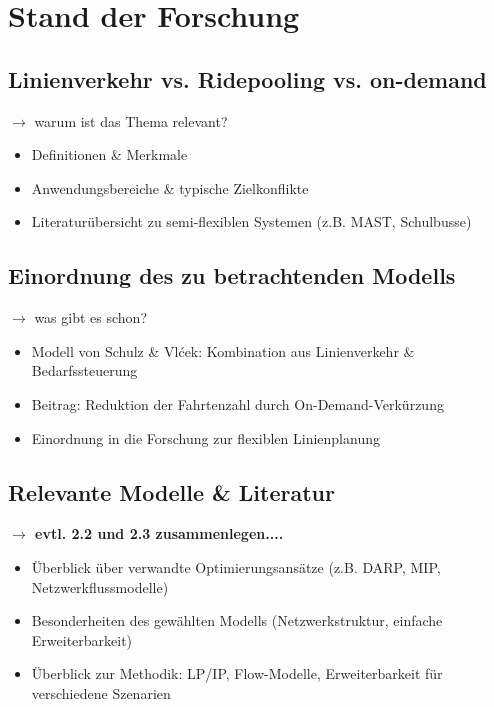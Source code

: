 \chapter{Stand der Forschung}
\section{Linienverkehr vs. Ridepooling vs. on-demand}

$\rightarrow$ warum ist das Thema relevant?

\begin{itemize}
    \item Definitionen \& Merkmale
    \item Anwendungsbereiche \& typische Zielkonflikte
    \item Literaturübersicht zu semi-flexiblen Systemen (z.B. MAST, Schulbusse)
\end{itemize}



\section{Einordnung des zu betrachtenden Modells}

$\rightarrow$ was gibt es schon?

\begin{itemize}
    \item Modell von Schulz \& Vlćek: Kombination aus Linienverkehr \& Bedarfssteuerung
    \item Beitrag: Reduktion der Fahrtenzahl durch On-Demand-Verkürzung
    \item Einordnung in die Forschung zur flexiblen Linienplanung
\end{itemize}
\section{Relevante Modelle \& Literatur}
\textbf{$\rightarrow$ evtl. 2.2 und 2.3 zusammenlegen....}
\begin{itemize}
    \item Überblick über verwandte Optimierungsansätze (z.B. DARP, MIP, Netzwerkflussmodelle)
    \item Besonderheiten des gewählten Modells (Netzwerkstruktur, einfache Erweiterbarkeit)
    \item Überblick zur Methodik: LP/IP, Flow-Modelle, Erweiterbarkeit für verschiedene Szenarien
\end{itemize}

